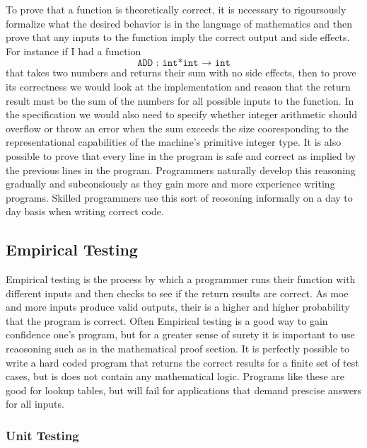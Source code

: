 \documentclass[12pt, letterpaper]{book}
\begin{document}
To prove that a function is theoretically correct, it is necessary to rigoursously formalize what the desired behavior is in the language of mathematics and then prove that any inputs to the function imply the correct output and side effects. 
	For instance if I had a function $$\texttt{ADD : int*int $\rightarrow$ int}$$ that takes two numbers and returns their sum with no side effects, then to prove its correctness we would look at the implementation and reason that the return result must be the sum of the numbers for all possible inputs to the function. In the specification we would also need to specify whether integer arithmetic should overflow or throw an error when the sum exceeds the size cooresponding to the representational capabilities of the machine's primitive integer type.
	It is also possible to prove that every line in the program is safe and correct as implied by the previous lines in the program. Programmers naturally develop this reasoning gradually and subconsiously as they gain more and more experience writing programs. Skilled programmers use this sort of reosoning informally on a day to day basis when writing correct code.

		\subsection{Empirical Testing}

	Empirical testing is the process by which a programmer runs their function with different inputs and then checks to see if the return results are correct. As moe and more inputs produce valid outputs, their is a higher and higher probability that the program is correct. Often Empirical testing is a good way to gain confidence one's program, but for a greater sense of surety it is important to use reaosoning such as in the mathematical proof section. It is perfectly possible to write a hard coded program that returns the correct results for a finite set of test cases, but is does not contain any mathematical logic. Programs like these are good for lookup tables, but will fail for applications that demand prescise answers for all inputs.

			\subsubsection{Unit Testing}
\end{document}
